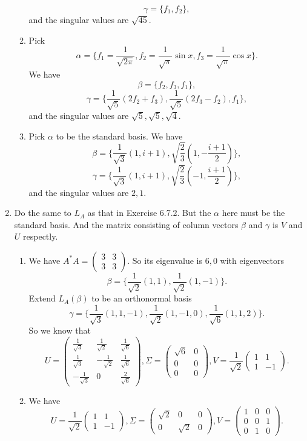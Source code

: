 \begin{enumerate}
\begin{enumerate}
\[\gamma =\{f_1,f_2\},\]
and the singular values are $\sqrt{45}$.
\item Pick 
\[\alpha =\{f_1=\frac{1}{\sqrt{2\pi}},f_2=\frac{1}{\sqrt{\pi}}\sin x,f_3=\frac{1}{\sqrt{\pi}}\cos x\}.\]
We have 
\[\beta =\{f_2,f_3,f_1\},\]
\[\gamma =\{\frac{1}{\sqrt{5}}(2f_2+f_3),\frac{1}{\sqrt{5}}(2f_3-f_2),f_1\},\]
and the singular values are $\sqrt{5},\sqrt{5},\sqrt{4}$.
\item Pick $\alpha $ to be the standard basis. We have  
\[\beta =\{\frac{1}{\sqrt{3}}(1,i+1),\sqrt{\frac{2}{3}}(1,-\frac{i+1}{2})\},\]
\[\gamma =\{\frac{1}{\sqrt{3}}(1,i+1),\sqrt{\frac{2}{3}}(-1,\frac{i+1}{2})\},\]
and the singular values are $2,1$.
\end{enumerate}
\item Do the same to $L_A$ as that in Exercise 6.7.2. But the $\alpha $ here must be the standard basis. And the matrix consisting of column vectors $\beta $ and $\gamma $ is $V$ and $U$ respectly. \begin{enumerate}
\item We have $A^*A=\begin{pmatrix}3&3\\3&3\end{pmatrix}$. So its eigenvalue is $6,0$ with eigenvectors 
\[\beta =\{\frac{1}{\sqrt{2}}(1,1),\frac{1}{\sqrt{2}}(1,-1)\}.\]
Extend $L_A(\beta)$ to be an orthonormal basis 
\[\gamma =\{\frac{1}{\sqrt{3}}(1,1,-1),\frac{1}{\sqrt{2}}(1,-1,0),\frac{1}{\sqrt{6}}(1,1,2)\}.\]
So we know that 
\[U=\begin{pmatrix}\frac{1}{\sqrt{3}}&\frac{1}{\sqrt{2}}&\frac{1}{\sqrt{6}}\\\frac{1}{\sqrt{3}}&-\frac{1}{\sqrt{2}}&\frac{1}{\sqrt{6}}\\-\frac{1}{\sqrt{3}}&0&\frac{2}{\sqrt{6}}\end{pmatrix} ,\Sigma =\begin{pmatrix}\sqrt{6}&0\\0&0\\0&0\end{pmatrix},V=\frac{1}{\sqrt{2}}\begin{pmatrix}1&1\\1&-1\end{pmatrix}.\]
\item We have 
\[U=\frac{1}{\sqrt{2}}\begin{pmatrix}1&1\\1&-1\end{pmatrix} ,\Sigma =\begin{pmatrix}\sqrt{2}&0&0\\0&\sqrt{2}&0\end{pmatrix},V=\begin{pmatrix}1&0&0\\0&0&1\\0&1&0\end{pmatrix}.\]

\end{enumerate}
\end{enumerate}
